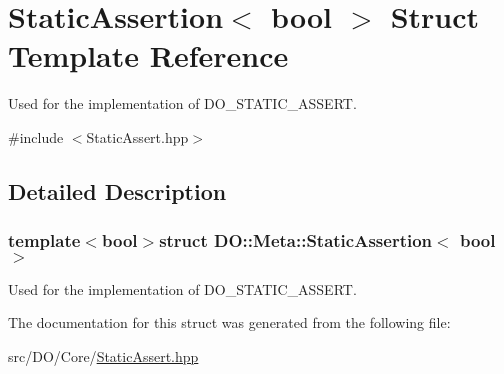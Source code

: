 \hypertarget{struct_d_o_1_1_meta_1_1_static_assertion}{\section{Static\-Assertion$<$ bool $>$ Struct Template Reference}
\label{struct_d_o_1_1_meta_1_1_static_assertion}
}


Used for the implementation of D\-O\-\_\-\-S\-T\-A\-T\-I\-C\-\_\-\-A\-S\-S\-E\-R\-T.  




{\ttfamily \#include $<$Static\-Assert.\-hpp$>$}



\subsection{Detailed Description}
\subsubsection*{template$<$bool$>$struct D\-O\-::\-Meta\-::\-Static\-Assertion$<$ bool $>$}

Used for the implementation of D\-O\-\_\-\-S\-T\-A\-T\-I\-C\-\_\-\-A\-S\-S\-E\-R\-T. 

The documentation for this struct was generated from the following file\-:\begin{DoxyCompactItemize}
\item 
src/\-D\-O/\-Core/\hyperlink{_static_assert_8hpp}{Static\-Assert.\-hpp}\end{DoxyCompactItemize}
